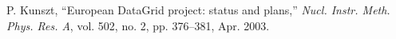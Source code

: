 \begin{thebibliography}{1}












P. Kunszt,
``European DataGrid project: status and plans,''
\emph{Nucl. Instr. Meth. Phys. Res. A},
vol. 502, no. 2, pp. 376--381, Apr. 2003.


\end{thebibliography}

